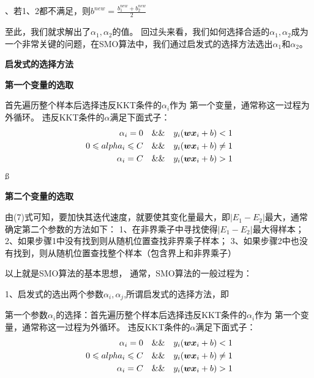 \documentclass[UTF8]{ctexart}
\begin{document}
、若1、2都不满足，则$b^{new}=\frac{b_1^{new}+b_2^{new}}{2}$

至此，我们就求解出了$\alpha_1,\alpha_2$的值。
回过头来看，我们如何选择合适的$\alpha_1,\alpha_2$成为一个非常关键的问题，在SMO算法中，我们通过启发式的选择方法选出$\alpha_1$和$\alpha_2$。

\noindent \large \textbf{启发式的选择方法}

\noindent \large \textbf{第一个变量的选取}

首先遍历整个样本后选择违反KKT条件的$\alpha_i$作为
第一个变量，通常称这一过程为外循环。
违反KKT条件的$\alpha$满足下面式子：
\begin{equation}\notag
    \begin{aligned}
        \alpha_i=0 \quad \&\& \quad y_i(\boldsymbol w \boldsymbol x_i + b) <1 \\
        0 \leqslant alpha_i \leqslant C \quad \&\& \quad y_i(\boldsymbol w \boldsymbol x_i + b) \neq 1 \\
        \alpha_i=C \quad \&\& \quad y_i(\boldsymbol w \boldsymbol x_i + b) >1
    \end{aligned}
\end{equation}ß

\noindent \large \textbf{第二个变量的选取}

由(7)式可知，要加快其迭代速度，就要使其变化量最大，即$|E_1-E_2|$最大，通常确定第二个参数的方法如下：
1、在非界乘子中寻找使得$|E_1-E_2|$最大得样本；
2、如果步骤1中没有找到则从随机位置查找非界乘子样本；
3、如果步骤2中也没有找到，则从随机位置查找整个样本（包含界上和非界乘子）

以上就是SMO算法的基本思想，
通常，SMO算法的一般过程为：

1、启发式的选出两个参数$\alpha_i,\alpha_j$,所谓启发式的选择方法，即

第一个参数$\alpha_i$的选择：首先遍历整个样本后选择违反KKT条件的$\alpha_i$作为
第一个变量，通常称这一过程为外循环。
违反KKT条件的$\alpha$满足下面式子：
\begin{equation}\notag
    \begin{aligned}
        \alpha_i=0 \quad \&\& \quad y_i(\boldsymbol w \boldsymbol x_i + b) <1 \\
        0 \leqslant alpha_i \leqslant C \quad \&\& \quad y_i(\boldsymbol w \boldsymbol x_i + b) \neq 1 \\
        \alpha_i=C \quad \&\& \quad y_i(\boldsymbol w \boldsymbol x_i + b) >1
    \end{aligned}
\end{equation}
\end{document}

